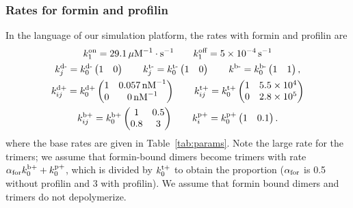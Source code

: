 \documentclass[11pt]{article}
\begin{document}
\begin{appendices}
\subsubsection{Rates for formin and profilin \label{sec:ForRateDet}}
In the language of our simulation platform, the rates with formin and profilin are
\begin{gather*}
k^\text{on}_1 = 29.1 \, \mu \textrm{M}^{-1} \cdot\text{s}^{-1}\qquad k^\text{off}_1 = 5 \times 10^{-4} \, \text{s}^{-1}  \\ \nonumber
k^\text{d-}_j = k^\text{d-}_0 \begin{pmatrix} 1 & 0 \end{pmatrix} \qquad 
k^\text{t-}_j = k^\text{t-}_0 \begin{pmatrix} 1 & 0 \end{pmatrix}\qquad 
k^\text{b-} = k^\text{b-}_0 \begin{pmatrix} 1 & 1 \end{pmatrix},\\
\nonumber
k^\text{d+}_{ij} = k^\text{d+}_0 \begin{pmatrix} 1 & 0.057 \, \textrm{nM}^{-1} \\ 0 & 0  \, \textrm{nM}^{-1} \end{pmatrix} \qquad 
k^\text{t+}_{ij} =k^\text{t+}_0 \begin{pmatrix} 1 & 5.5 \times 10^4 \\ 0 & 2.8 \times 10^5 \end{pmatrix} \\
k^\text{b+}_{ij} =k^\text{b+}_0 \begin{pmatrix} 1 & 0.5 \\ 0.8 & 3 \end{pmatrix} 
\qquad 
k^\text{p+}_{i} =k^\text{p+}_0 \begin{pmatrix} 1 & 0.1 \\ \end{pmatrix}.
\end{gather*}
where the base rates are given in Table\ \ref{tab:params}. Note the large rate for the trimers; we assume that formin-bound dimers become trimers with rate $\alpha_\text{for} k^\text{b+}_0+k^\text{p+}_0$, which is divided by $k^\text{t+}_0$ to obtain the proportion ($\alpha_\text{for}$ is 0.5 without profilin and 3 with profilin). We assume that formin bound dimers and trimers do not depolymerize.


\end{appendices}
\end{document}
